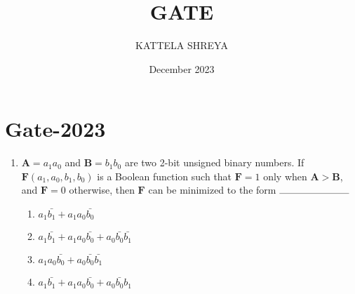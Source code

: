 \documentclass[10pt]{article}
\title{GATE}
\author{KATTELA SHREYA}
\date{December 2023}
\let\vec\mathbf
\providecommand{\brak}[1]{\ensuremath{\left(#1\right)}}
\begin{document}
\maketitle
\section{Gate-2023}
\begin{enumerate}
\item $\vec{A}=a_1a_0$ and $\vec{B}=b_1b_0$ are two 2-bit unsigned binary numbers. If $\vec{F}\brak{a_1,a_0,b_1,b_0}$ is a Boolean function such that $\vec{F} = 1$ only when $\vec{A > B}$, and $\vec{F} = 0$ otherwise, then $\vec{F}$ can be minimized to the form $\rule{2.5cm}{0.10mm}$
\begin{enumerate}
\item $a_1\bar{b_1}+a_1a_0\bar{b_0}$
\item $a_1\bar{b_1}+a_1a_0\bar{b_0}+a_0\bar{b_0}\bar{b_1}$
\item $a_1a_0\bar{b_0}+a_0\bar{b_0}\bar{b_1}$
\item $a_1\bar{b_1}+a_1a_0\bar{b_0}+a_0\bar{b_0}b_1$
\end{enumerate}    
\end{enumerate}
\end{document}
